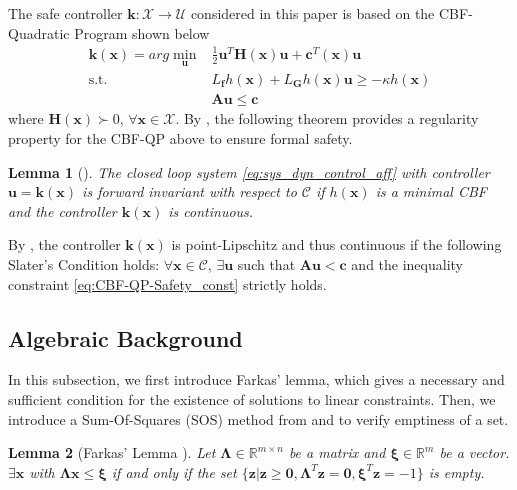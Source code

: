 \documentclass[letterpaper, 10 pt, conference]{ieeeconf}  %
\newtheorem{lemma}{Lemma}
\begin{document}
The safe controller $\mathbf{k}:\mathcal{X}\rightarrow\mathcal{U}$ considered in this paper is based on the CBF-Quadratic Program shown below
\begin{subequations}
\label{eq:CBF-QP}
\begin{align}
    \mathbf{k}(\mathbf{x}) = arg\min_{\mathbf{u}}& \frac{1}{2}\mathbf{u}^T\mathbf{H}(\mathbf{x})\mathbf{u} + \mathbf{c}^T(\mathbf{x})\mathbf{u}\\
    \text{s.t. }& L_{\mathbf{f}}h(\mathbf{x}) + L_{\mathbf{G}}h(\mathbf{x})\mathbf{u} \geq -\kappa h(\mathbf{x}) \label{eq:CBF-QP-Safety_const}\\
    & \mathbf{A}\mathbf{u} \leq \mathbf{c}
\end{align}
\end{subequations}
where $\mathbf{H}(\mathbf{x})\succ 0$, $\forall \mathbf{x}\in\mathcal{X}$. By \cite[Theorem 5.4]{mestres2025regularity}, the following theorem provides a regularity property for the CBF-QP above to ensure formal safety.
\begin{lemma}[\cite{mestres2025regularity}]
\label{thm:minimal_CBF+forward_inv}
    The closed loop system \eqref{eq:sys_dyn_control_aff} with controller $\mathbf{u}=\mathbf{k}(\mathbf{x})$ is forward invariant with respect to $\mathcal{C}$ if $h(\mathbf{x})$ is a minimal CBF and the controller $\mathbf{k}(\mathbf{x})$ is continuous. 
\end{lemma}

By \cite{mestres2025regularity}, the controller $\mathbf{k}(\mathbf{x})$ is point-Lipschitz and thus continuous if the following Slater's Condition holds: $\forall \mathbf{x}\in\mathcal{C}$, $\exists\mathbf{u}$ such that $\mathbf{A}\mathbf{u}<\mathbf{c}$ and the inequality constraint \eqref{eq:CBF-QP-Safety_const} strictly holds.


\subsection{Algebraic Background}
In this subsection, we first introduce Farkas' lemma, which gives a necessary and sufficient condition for the existence of solutions to linear constraints. Then, we introduce a Sum-Of-Squares (SOS) method from \cite{dai2023convex} and \cite{dai2024verification} to verify emptiness of a set. 
\begin{lemma}[Farkas' Lemma \cite{matousek2006understanding}]
\label{lemma:farkas}
    Let $\boldsymbol{\Lambda} \in \mathbb{R}^{m\times n}$ be a matrix and $\boldsymbol{\xi} \in \mathbb{R}^{m}$ be a vector. $\exists \mathbf{x}$ with  $\boldsymbol{\Lambda} \mathbf{x}\leq\boldsymbol{\xi}$ if and only if the set $\{\mathbf{z}|\mathbf{z}\geq\mathbf{0},  \boldsymbol{\Lambda}^T\mathbf{z} = \mathbf{0}, \boldsymbol{\xi}^T\mathbf{z}=-1\}$ is empty.
\end{lemma}
\end{document}
